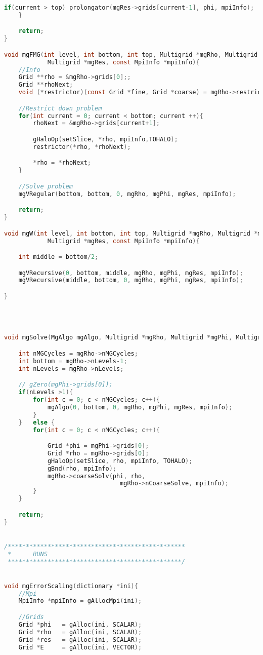 \begin{lstlisting}[language=c, caption = main routine]
		if(current > top) prolongator(mgRes->grids[current-1], phi, mpiInfo);
	}

	return;
}

void mgFMG(int level, int bottom, int top, Multigrid *mgRho, Multigrid *mgPhi,
 			Multigrid *mgRes, const MpiInfo *mpiInfo){
	//Info
	Grid **rho = &mgRho->grids[0];;
	Grid **rhoNext;
	void (*restrictor)(const Grid *fine, Grid *coarse) = mgRho->restrictor;

	//Restrict down problem
	for(int current = 0; current < bottom; current ++){
		rhoNext = &mgRho->grids[current+1];

		gHaloOp(setSlice, *rho, mpiInfo,TOHALO);
		restrictor(*rho, *rhoNext);

		*rho = *rhoNext;
	}

	//Solve problem
	mgVRegular(bottom, bottom, 0, mgRho, mgPhi, mgRes, mpiInfo);

	return;
}

void mgW(int level, int bottom, int top, Multigrid *mgRho, Multigrid *mgPhi,
			Multigrid *mgRes, const MpiInfo *mpiInfo){

	int middle = bottom/2;

	mgVRecursive(0, bottom, middle, mgRho, mgPhi, mgRes, mpiInfo);
	mgVRecursive(middle, bottom, 0, mgRho, mgPhi, mgRes, mpiInfo);

}




void mgSolve(MgAlgo mgAlgo, Multigrid *mgRho, Multigrid *mgPhi, Multigrid *mgRes, const MpiInfo *mpiInfo){

	int nMGCycles = mgRho->nMGCycles;
	int bottom = mgRho->nLevels-1;
	int nLevels = mgRho->nLevels;

	// gZero(mgPhi->grids[0]);
	if(nLevels >1){
		for(int c = 0; c < nMGCycles; c++){
			mgAlgo(0, bottom, 0, mgRho, mgPhi, mgRes, mpiInfo);
		}
	}	else {
		for(int c = 0; c < nMGCycles; c++){

			Grid *phi = mgPhi->grids[0];
			Grid *rho = mgRho->grids[0];
			gHaloOp(setSlice, rho, mpiInfo, TOHALO);
			gBnd(rho, mpiInfo);
			mgRho->coarseSolv(phi, rho,
								mgRho->nCoarseSolve, mpiInfo);
		}
	}

	return;
}


/*************************************************
 *		RUNS
 ************************************************/


void mgErrorScaling(dictionary *ini){
	//Mpi
	MpiInfo *mpiInfo = gAllocMpi(ini);

	//Grids
	Grid *phi 	= gAlloc(ini, SCALAR);
	Grid *rho 	= gAlloc(ini, SCALAR);
	Grid *res 	= gAlloc(ini, SCALAR);
	Grid *E		= gAlloc(ini, VECTOR);


\end{lstlisting}
